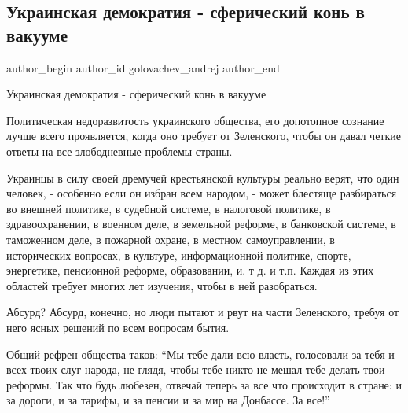  
 
 
 
 
 
\subsection{Украинская демократия - сферический конь в вакууме}
\label{sec:14_02_2022.fb.golovachev_andrej.1.ukr_demokratia_kon_v_vakuume}
 
\ifcmt
 author_begin
   author_id golovachev_andrej
 author_end
\fi

Украинская демократия - сферический конь в вакууме

Политическая недоразвитость украинского общества, его   допотопное  сознание
лучше всего проявляется,  когда оно требует от Зеленского, чтобы он давал
четкие  ответы на все злободневные проблемы страны. 

Украинцы в силу своей дремучей крестьянской культуры реально верят, что один
человек, - особенно если он избран всем народом, - может блестяще разбираться во
внешней политике,  в судебной системе, в налоговой политике, в здравоохранении,
в военном деле, в земельной реформе, в банковской системе, в таможенном деле, в
пожарной охране, в местном самоуправлении, в исторических вопросах, в культуре,
информационной политике, спорте, энергетике, пенсионной реформе, образовании,
и. т д. и т.п.  Каждая из этих областей требует многих лет изучения, чтобы в
ней разобраться. 

Абсурд?    Абсурд, конечно, но люди пытают и рвут на части Зеленского, требуя
от него ясных решений по всем вопросам бытия.

Общий рефрен общества таков:    \enquote{Мы тебе дали всю власть, голосовали за
тебя и всех твоих слуг народа, не глядя, чтобы тебе никто не мешал  тебе делать
твои  реформы. Так что будь любезен, отвечай теперь за все что происходит в
стране: и  за дороги, и за тарифы, и за пенсии и за мир на Донбассе. За все!}

